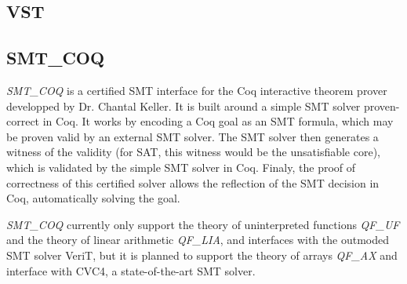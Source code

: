 \documentclass[onecolumn, preprint]{sigplanconf}
\begin{document}
\subsection{VST}


\subsection{SMT\_COQ}
\emph{SMT\_COQ} is a certified SMT interface for the Coq interactive theorem prover developped by Dr. Chantal Keller. It is built around a simple SMT solver proven-correct in Coq.
It works by encoding a Coq goal as an SMT formula, which may be proven valid by an external SMT solver. The SMT solver then generates a witness of the validity (for SAT, this witness would be the unsatisfiable core), which is validated by the simple SMT solver in Coq. Finaly, the proof of correctness of this certified solver allows the reflection of the SMT decision in Coq, automatically solving the goal.

\emph{SMT\_COQ} currently only support the theory of uninterpreted functions \emph{QF\_UF} and the theory of linear arithmetic \emph{QF\_LIA}, and interfaces with the outmoded SMT solver VeriT, but it is planned to support the theory of arrays \emph{QF\_AX} and interface with CVC4, a state-of-the-art SMT solver.

\end{document}
